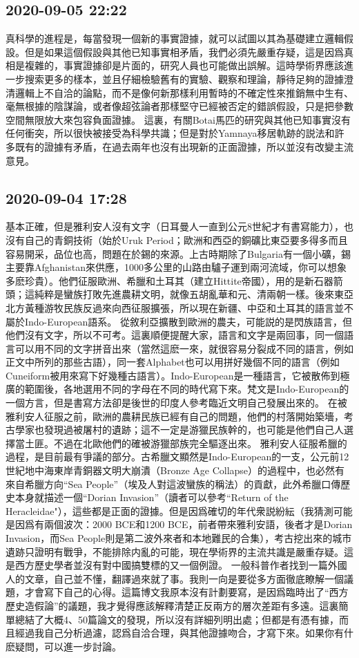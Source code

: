 \documentclass[twocolumn]{ctexart}
\begin{document}
\subsection*{2020-09-05 22:22}

真科學的進程是，每當發現一個新的事實證據，就可以試圖以其為基礎建立邏輯假設。但是如果這個假設與其他已知事實相矛盾，我們必須先嚴重存疑，這是因爲真相是複雜的，事實證據卻是片面的，研究人員也可能做出誤解。這時學術界應該進一步搜索更多的樣本，並且仔細檢驗舊有的實驗、觀察和理論，靜待足夠的證據澄清邏輯上不自洽的論點，而不是像何新那樣利用暫時的不確定性來推銷無中生有、毫無根據的陰謀論，或者像超弦論者那樣堅守已經被否定的錯誤假設，只是把參數空間無限放大來包容負面證據。
這裏，有關Botai馬匹的研究與其他已知事實沒有任何衝突，所以很快被接受為科學共識；但是對於Yamnaya移居軌跡的説法和許多既有的證據有矛盾，在過去兩年也沒有出現新的正面證據，所以並沒有改變主流意見。
\subsection*{2020-09-04 17:28}

基本正確，但是雅利安人沒有文字（日耳曼人一直到公元8世紀才有書寫能力），也沒有自己的青銅技術（始於Uruk Period；歐洲和西亞的銅礦比東亞要多得多而且容易開采，品位也高，問題在於錫的來源。上古時期除了Bulgaria有一個小礦，錫主要靠Afghanistan來供應，1000多公里的山路由驢子運到兩河流域，你可以想象多麽珍貴）。他們征服歐洲、希臘和土耳其（建立Hittite帝國），用的是新石器箭頭；這純粹是蠻族打敗先進農耕文明，就像五胡亂華和元、清兩朝一樣。後來東亞北方黃種游牧民族反過來向西征服擴張，所以現在新疆、中亞和土耳其的語言並不屬於Indo-European語系。
從敘利亞擴散到歐洲的農夫，可能説的是閃族語言，但他們沒有文字，所以不可考。這裏順便提醒大家，語言和文字是兩回事，同一個語言可以用不同的文字拼音出來（當然這麽一來，就很容易分裂成不同的語言，例如正文中所列的那些古語），同一套Alphabet也可以用拼好幾個不同的語言（例如Cuneiform被用來寫下好幾種古語言）。Indo-European是一種語言，它被散佈到極廣的範圍後，各地選用不同的字母在不同的時代寫下來。梵文是Indo-European的一個方言，但是書寫方法卻是後世的印度人參考臨近文明自己發展出來的。
在被雅利安人征服之前，歐洲的農耕民族已經有自己的問題，他們的村落開始築墻，考古學家也發現過被屠村的遺跡；這不一定是游獵民族幹的，也可能是他們自己人選擇當土匪。不過在北歐他們的確被游獵部族完全驅逐出來。
雅利安人征服希臘的過程，是目前最有爭議的部分。古希臘文顯然是Indo-European的一支，公元前12世紀地中海東岸青銅器文明大崩潰（Bronze Age Collapse）的過程中，也必然有來自希臘方向“Sea People”（埃及人對這波蠻族的稱法）的貢獻，此外希臘口傳歷史本身就描述一個“Dorian Invasion”（讀者可以參考“Return of the Heracleidae"），這些都是正面的證據。但是因爲確切的年代衆説紛紜（我猜測可能是因爲有兩個波次：2000 BCE和1200 BCE，前者帶來雅利安語，後者才是Dorian Invasion，而Sea People則是第二波外來者和本地難民的合集），考古挖出來的城市遺跡只證明有戰爭，不能排除内亂的可能，現在學術界的主流共識是嚴重存疑。這是西方歷史學者並沒有對中國搞雙標的又一個例證。
一般科普作者找到一篇外國人的文章，自己並不懂，翻譯過來就了事。我則一向是要從多方面徹底瞭解一個議題，才會寫下自己的心得。這篇博文我原本沒有計劃要寫，是因爲臨時出了“西方歷史造假論”的議題，我才覺得應該解釋清楚正反兩方的層次差距有多遠。這裏簡單總結了大概4、50篇論文的發現，所以沒有詳細列明出處；但都是有憑有據，而且經過我自己分析過濾，認爲自洽合理，與其他證據吻合，才寫下來。如果你有什麽疑問，可以進一步討論。
\end{document}
